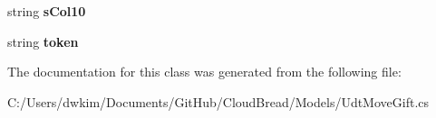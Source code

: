 \begin{DoxyCompactItemize}
\item 
string {\bfseries s\+Col10}\hypertarget{a00112_abfe0e7696e6d24d7620f22afa9fdfe0b}{}\label{a00112_abfe0e7696e6d24d7620f22afa9fdfe0b}

\item 
string {\bfseries token}\hypertarget{a00112_a0f9128a5f73627d9a72c6f29ba71317e}{}\label{a00112_a0f9128a5f73627d9a72c6f29ba71317e}

\end{DoxyCompactItemize}


The documentation for this class was generated from the following file\+:\begin{DoxyCompactItemize}
\item 
C\+:/\+Users/dwkim/\+Documents/\+Git\+Hub/\+Cloud\+Bread/\+Models/Udt\+Move\+Gift.\+cs\end{DoxyCompactItemize}
